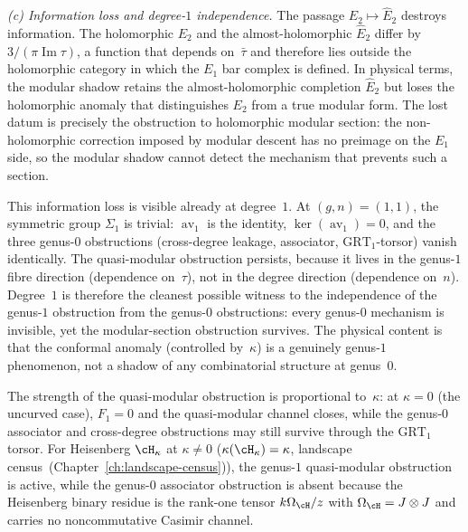 \begin{remark}
\emph{(c) Information loss and degree-$1$ independence.}
The passage $E_2 \mapsto \widehat{E}_2$ destroys information.
The holomorphic $E_2$ and the almost-holomorphic
$\widehat{E}_2$ differ by $3/(\pi\operatorname{Im}\tau)$,
a function that depends on~$\bar{\tau}$ and therefore lies
outside the holomorphic category in which the $E_1$ bar complex
is defined. In physical terms, the modular shadow retains the
almost-holomorphic completion $\widehat{E}_2$ but loses the
holomorphic anomaly that distinguishes $E_2$ from a true
modular form. The lost datum is precisely the obstruction to
holomorphic modular section: the non-holomorphic correction imposed
by modular descent has no preimage on the $E_1$ side, so the modular
shadow cannot detect the mechanism that prevents such a section.

This information loss is visible already at degree~$1$.
At $(g,n) = (1,1)$, the symmetric group $\Sigma_1$ is trivial:
$\operatorname{av}_1$ is the identity,
$\ker(\operatorname{av}_1) = 0$, and the three genus-$0$
obstructions \textup{(}cross-degree leakage, associator,
$\mathrm{GRT}_1$-torsor\textup{)} vanish identically.
The quasi-modular obstruction persists, because it lives in
the genus-$1$ fibre direction \textup{(}dependence on~$\tau$\textup{)},
not in the degree direction
\textup{(}dependence on~$n$\textup{)}.
Degree~$1$ is therefore the cleanest possible witness to the
independence of the genus-$1$ obstruction from the genus-$0$
obstructions: every genus-$0$ mechanism is invisible, yet the
modular-section obstruction survives. The physical content is that
the conformal anomaly \textup{(}controlled by~$\kappa$\textup{)} is a
genuinely genus-$1$ phenomenon, not a shadow of any combinatorial
structure at genus~$0$.

The strength of the quasi-modular obstruction is proportional to~$\kappa$:
at $\kappa = 0$ \textup{(}the uncurved case\textup{)}, $F_1 = 0$
and the quasi-modular channel closes, while the genus-$0$
associator and cross-degree obstructions may still survive through
the $\mathrm{GRT}_1$ torsor.
For Heisenberg $\cH_\kappa$ at $\kappa \neq 0$
\textup{(}$\kappa(\cH_\kappa) = \kappa$, landscape
census~\textup{(}Chapter~\textup{\ref{ch:landscape-census}}\textup{)}\textup{)}, the genus-$1$
quasi-modular obstruction is active, while the genus-$0$ associator
obstruction is absent because the Heisenberg binary residue is the
rank-one tensor $k\Omega_{\cH}/z$ with $\Omega_{\cH}=J\otimes J$ and
carries no noncommutative Casimir channel.
\end{remark}

